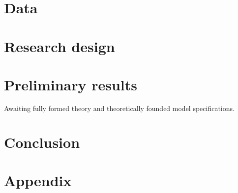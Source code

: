 \documentclass[12pt]{article}
\begin{document}
\section{Data}

\section{Research design}

\section{Preliminary results}

Awaiting fully formed theory and theoretically founded model specifications.

\section{Conclusion}

\pagebreak




\section{Appendix}
\end{document}
